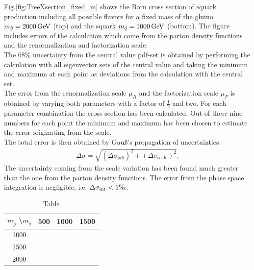 Fig.\ref{fig:TreeXsection_fixed_m} shows the Born cross section of squark production including all possible flavors for a fixed mass of the gluino $m_{\tilde{g}} = \unit[2000]{GeV}$ (top) and the squark $m_{\tilde{q}} = \unit[1000]{GeV}$ (bottom). The figure includes errors of the calculation which come from the parton density functions and the renormalization and factorization scale.\\
The 68\% uncertainty from the central value pdf-set is obtained by performing the calculation with all eigenvector sets of the central value and taking the minimum and maximum at each point as deviations from the calculation with the central set.\\
The error from the renormalization scale $\mu_R$ and the factorization scale $\mu_F$ is obtained by varying both parameters with a factor of $\frac{1}{2}$ and two. For each parameter combination the cross section has been calculated. Out of these nine numbers for each point the minimum and maximum has been chosen to estimate the error originating from the scale.\\
The total error is then obtained by Gauß's propagation of uncertainties:
\begin{align}
\Delta \sigma = \sqrt{(\Delta \sigma_{\mathrm{pdf}})^2 + (\Delta \sigma_{\mathrm{scale}})^2}.
\end{align}
The uncertainty coming from the scale variation has been found much greater than the one from the parton density functions. The error from the phase space integration is negligible, i.e. $\Delta \sigma_{\mathrm{int}} < 1\text{\textperthousand}$.
\begin{table}
\begin{center}
\begin{tabular}{c|c|c|c}\label{tab:MSSMfieldcontent}
$m_{\tilde{g}}$ \textbackslash $m_{\tilde{q}}$ & 500 & 1000 & 1500\\
\hline
1000 &  &  & \\
1500 &  &  & \\
2000 &  &  & \\
\end{tabular}
\caption{Table}
\end{center}
\end{table}
